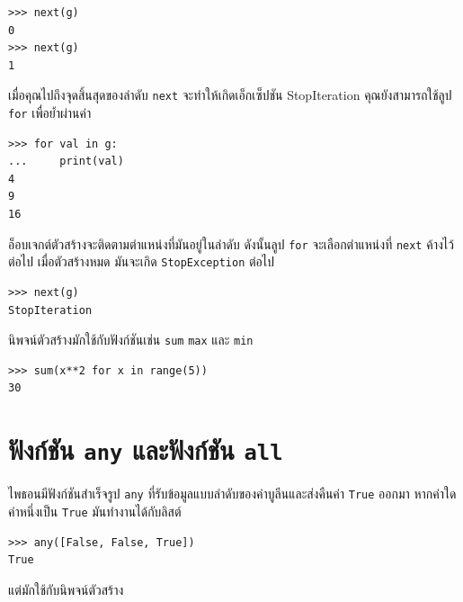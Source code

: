 \begin{verbatim}
>>> next(g)
0
>>> next(g)
1
\end{verbatim}
%
เมื่อคุณไปถึงจุดสิ้นสุดของลำดับ {\tt next} จะทำให้เกิดเอ็กเซ็ปชัน StopIteration คุณยังสามารถใช้ลูป {\tt for} เพื่อย้ำผ่านค่า

\begin{verbatim}
>>> for val in g:
...     print(val)
4
9
16
\end{verbatim}
%
อ็อบเจกต์ตัวสร้างจะติดตามตำแหน่งที่มันอยู่ในลำดับ ดังนั้นลูป {\tt for} จะเลือกตำแหน่งที่ {\tt next} ค้างไว้ต่อไป เมื่อตัวสร้างหมด มันจะเกิด {\tt StopException} ต่อไป

\begin{verbatim}
>>> next(g)
StopIteration
\end{verbatim}

นิพจน์ตัวสร้างมักใช้กับฟังก์ชันเช่น {\tt sum} {\tt max} และ {\tt min}

\begin{verbatim}
>>> sum(x**2 for x in range(5))
30
\end{verbatim}


\section{ฟังก์ชัน {\tt any} และฟังก์ชัน {\tt all}}

ไพธอนมีฟังก์ชันสำเร็จรูป {\tt any} ที่รับข้อมูลแบบลำดับของค่าบูลีนและส่งคืนค่า {\tt True} ออกมา หากค่าใดค่าหนึ่งเป็น {\tt True} 
มันทำงานได้กับลิสต์

\begin{verbatim}
>>> any([False, False, True])
True
\end{verbatim}
%
แต่มักใช้กับนิพจน์ตัวสร้าง

